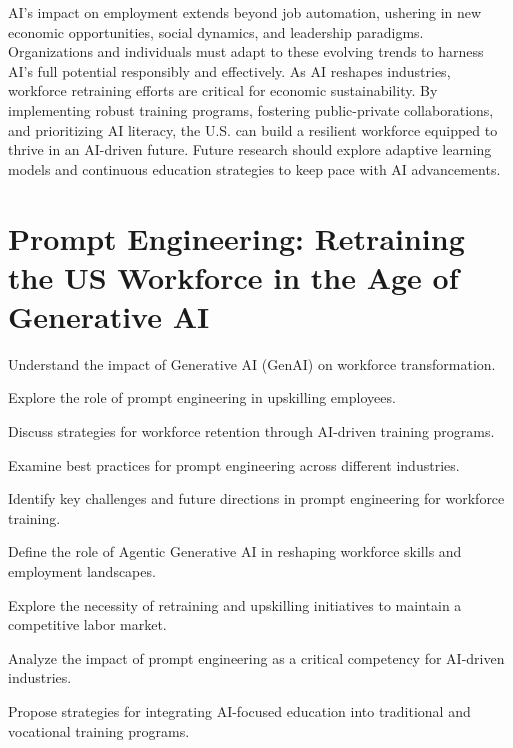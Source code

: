 \documentclass[a4paper,headinclude=on,footinclude=on,12pt,oneside]{scrbook}
\begin{document}

AI’s impact on employment extends beyond job automation, ushering in new economic opportunities, social dynamics, and leadership paradigms. Organizations and individuals must adapt to these evolving trends to harness AI’s full potential responsibly and effectively.
As AI reshapes industries, workforce retraining efforts are critical for economic sustainability. By implementing robust training programs, fostering public-private collaborations, and prioritizing AI literacy, the U.S. can build a resilient workforce equipped to thrive in an AI-driven future. Future research should explore adaptive learning models and continuous education strategies to keep pace with AI advancements.







%



\chapter{Prompt Engineering: Retraining the US Workforce in the Age of Generative AI}
\begin{arrows}
	\item Understand the impact of Generative AI (GenAI) on workforce transformation.
	\item Explore the role of prompt engineering in upskilling employees.
	\item Discuss strategies for workforce retention through AI-driven training programs.
	\item Examine best practices for prompt engineering across different industries.
	\item Identify key challenges and future directions in prompt engineering for workforce training.
	
	
	
		\item Define the role of Agentic Generative AI in reshaping workforce skills and employment landscapes.
	\item Explore the necessity of retraining and upskilling initiatives to maintain a competitive labor market.
	\item Analyze the impact of prompt engineering as a critical competency for AI-driven industries.
	\item Propose strategies for integrating AI-focused education into traditional and vocational training programs.
	
	
\end{arrows}
\end{document}
